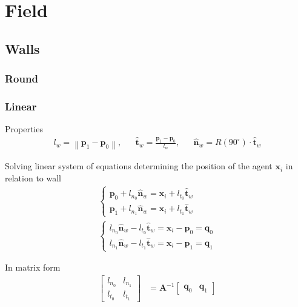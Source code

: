 \section{Field}
\subsection{Walls}
\subsubsection{Round}

\subsubsection{Linear}
Properties
\begin{align}
l_{w} = \left\|\mathbf{p}_{1} - \mathbf{p}_{0}\right\|, && \hat{\mathbf{t}}_{w} = \frac{\mathbf{p}_{1} - \mathbf{p}_{0}}{l_{w}}, && \hat{\mathbf{n}}_{w} = R(90^{\circ}) \cdot \hat{\mathbf{t}}_{w}
\end{align}

Solving linear system of equations determining the position of the agent $ \mathbf{x}_{i} $ in relation to wall
\begin{align}
\begin{cases}
\mathbf{p}_{0} + l_{n_0} \hat{\mathbf{n}}_{w} = \mathbf{x}_{i} + l_{t_0} \hat{\mathbf{t}}_{w} \\
\mathbf{p}_{1} + l_{n_1} \hat{\mathbf{n}}_{w} = \mathbf{x}_{i} + l_{t_1} \hat{\mathbf{t}}_{w}
\end{cases} 
\\
\begin{cases}
l_{n_0} \hat{\mathbf{n}}_{w} - l_{t_0} \hat{\mathbf{t}}_{w} = \mathbf{x}_{i} - \mathbf{p}_{0} =  \mathbf{q}_{0} \\
l_{n_1} \hat{\mathbf{n}}_{w} - l_{t_1} \hat{\mathbf{t}}_{w} = \mathbf{x}_{i} - \mathbf{p}_{1} = \mathbf{q}_{1}
\end{cases}
\end{align}

In matrix form
\begin{align}
\begin{bmatrix} l_{n_0} & l_{n_1} \\ l_{t_0} & l_{t_1} \end{bmatrix} &= \mathbf{A}^{-1} \begin{bmatrix} \mathbf{q}_{0} & \mathbf{q}_{1} \end{bmatrix}
\end{align}

